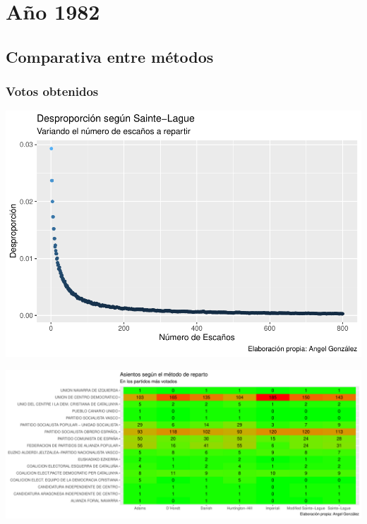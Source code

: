 \documentclass[12pt,a4paper,]{book}
\numberwithin{dummy}{section}
\theoremstyle{ocrenumbox}
\theoremstyle{blacknumex}
\theoremstyle{blacknumbox}
\theoremstyle{ocrenum}
\theoremstyle{ocrenum}
\begin{document}
\hypertarget{auxf1o-1982}{%
\section{Año 1982}\label{auxf1o-1982}}

\hypertarget{comparativa-entre-muxe9todos-2}{%
\subsection{Comparativa entre
métodos}\label{comparativa-entre-muxe9todos-2}}

\hypertarget{votos-obtenidos-2}{%
\subsubsection{Votos obtenidos}\label{votos-obtenidos-2}}

\begin{center}\includegraphics[width=1\linewidth]{figurasR/unnamed-chunk-11-1} \end{center}

\begin{center}\includegraphics[width=1\linewidth]{figurasR/unnamed-chunk-11-2} \end{center}
\end{document}
